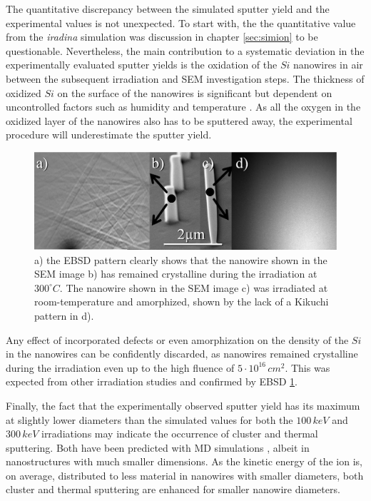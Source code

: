 The quantitative discrepancy between the simulated sputter yield and the experimental values is not unexpected. To start with, the the quantitative value from the \emph{iradina} simulation was discussion in chapter \ref{sec:simion} to be questionable. Nevertheless, the main contribution to a systematic deviation in the experimentally evaluated sputter yields is the oxidation of the $Si$ nanowires in air between the subsequent irradiation and SEM investigation steps. The thickness of oxidized $Si$ on the surface of the nanowires is significant but dependent on uncontrolled factors such as humidity and temperature \cite{lukes_oxidation_1972,al-bayati_composition_1991}. As all the oxygen in the oxidized layer of the nanowires also has to be sputtered away, the experimental procedure will underestimate the sputter yield.

\begin{figure}
	\centering
		\includegraphics[width=.4\textwidth]{images/suppfig_EBSD.jpg}
	\caption{a) the EBSD pattern clearly shows that the nanowire shown in the SEM image b) has remained crystalline during the irradiation at $300^\circ C$. The nanowire shown in the SEM image c) was irradiated at room-temperature and amorphized, shown by the lack of a Kikuchi pattern in d).} 
	\label{EBSD}
\end{figure}

Any effect of incorporated defects or even amorphization on the density of the $Si$ in the nanowires can be confidently discarded, as nanowires remained crystalline during the irradiation even up to the high fluence of $5\cdot 10^{16}\,cm^2$. This was expected from other irradiation studies \cite{pelaz_ion-beam-induced_2004} and confirmed by EBSD \ref{EBSD}.

Finally, the fact that the experimentally observed sputter yield has its maximum at slightly lower diameters than the simulated values for both the $100\,keV$ and $300\,keV$ irradiations may indicate the occurrence of cluster and thermal sputtering. Both have been predicted with MD simulations \cite{nietiadi_sputtering_2014,urbassek_sputter_2015,anders_sputtering_2015}, albeit in nanostructures with much smaller dimensions. As the kinetic energy of the ion is, on average, distributed to less material in nanowires with smaller diameters, both cluster and thermal sputtering are enhanced for smaller nanowire diameters.

